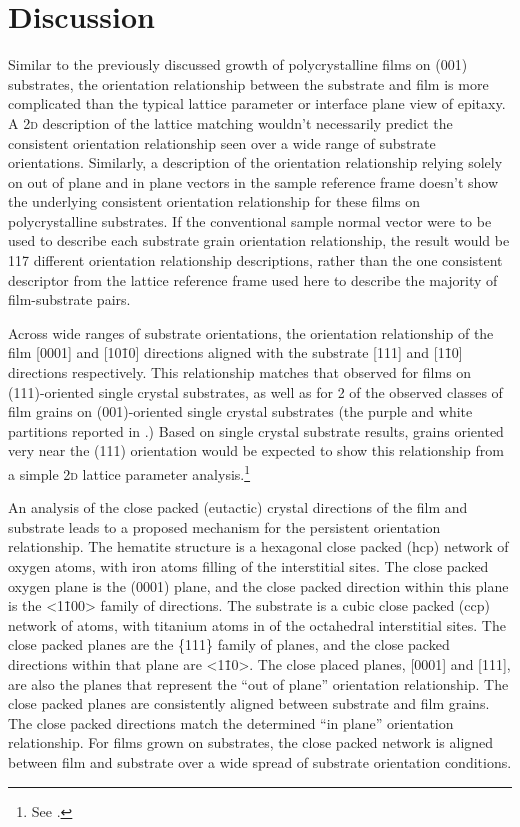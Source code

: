 \section{Discussion}
\label{sec:poly.growth.discussion}
		
		
Similar to the previously discussed growth of polycrystalline  films on  (001) substrates, the orientation relationship between the substrate and film is more complicated than the typical lattice parameter or interface plane view of epitaxy. A 2\textsc{d} description of the lattice matching wouldn't necessarily predict the consistent orientation relationship seen over a wide range of substrate orientations. Similarly, a description of the orientation relationship relying solely on out of plane and in plane vectors in the sample reference frame doesn't show the underlying consistent orientation relationship for these films on polycrystalline substrates. If the conventional sample normal vector were to be used to describe each substrate grain orientation relationship, the result would be 117 different orientation relationship descriptions, rather than the one consistent descriptor from the lattice reference frame used here to describe the majority of film-substrate pairs.

Across wide ranges of substrate orientations, the orientation relationship of the film [0001] and [10\={1}0] directions aligned with the substrate [111] and [1\={1}0] directions respectively. This relationship matches that observed for films on (111)-oriented single crystal substrates, as well as for 2 of the observed classes of film grains on (001)-oriented single crystal substrates (the purple and white partitions reported in .) Based on single crystal substrate results, grains oriented very near the (111) orientation would be expected to show this relationship from a simple 2\textsc{d} lattice parameter analysis.\footnote{See .}

An analysis of the close packed (eutactic)\cite{OKeeffe:1977vx} crystal directions of the film and substrate leads to a proposed mechanism for the persistent orientation relationship. The hematite structure is a hexagonal close packed (hcp) network of oxygen atoms, with iron atoms filling  of the interstitial sites. The close packed oxygen plane is the (0001) plane, and the close packed direction within this plane is the <1\={1}00> family of directions. The  substrate is a cubic close packed (ccp) network of  atoms, with titanium atoms in  of the octahedral interstitial sites. The close packed planes are the \{111\} family of planes, and the close packed directions within that plane are <1\={1}0>. The close placed planes, [0001] and [111], are also the planes that represent the ``out of plane'' orientation relationship. The close packed planes are consistently aligned between substrate and film grains. The close packed directions match the determined ``in plane'' orientation relationship. For  films grown on  substrates, the close packed network is aligned between film and substrate over a wide spread of substrate orientation conditions.

